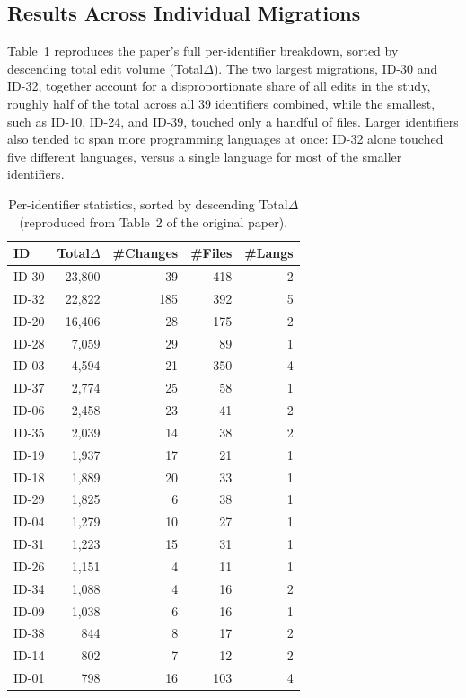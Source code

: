 \subsection{Results Across Individual Migrations}
Table~\ref{tab:perid} reproduces the paper's full per-identifier
breakdown, sorted by descending total edit volume (Total$\Delta$).
The two largest migrations, ID-30 and ID-32, together account for a
disproportionate share of all edits in the study, roughly half of the
total across all 39 identifiers combined, while the smallest, such as
ID-10, ID-24, and ID-39, touched only a handful of files. Larger
identifiers also tended to span more programming languages at once:
ID-32 alone touched five different languages, versus a single
language for most of the smaller identifiers.


\begin{table}[t]
\caption{Per-identifier statistics, sorted by descending Total$\Delta$ (reproduced from Table~2 of the original paper).}
\label{tab:perid}
\footnotesize
\begin{tabular}{@{}lrrrr@{}}
\toprule
ID & Total$\Delta$ & \#Changes & \#Files & \#Langs \\
\midrule
ID-30 & 23{,}800 & 39 & 418 & 2 \\
ID-32 & 22{,}822 & 185 & 392 & 5 \\
ID-20 & 16{,}406 & 28 & 175 & 2 \\
ID-28 & 7{,}059 & 29 & 89 & 1 \\
ID-03 & 4{,}594 & 21 & 350 & 4 \\
ID-37 & 2{,}774 & 25 & 58 & 1 \\
ID-06 & 2{,}458 & 23 & 41 & 2 \\
ID-35 & 2{,}039 & 14 & 38 & 2 \\
ID-19 & 1{,}937 & 17 & 21 & 1 \\
ID-18 & 1{,}889 & 20 & 33 & 1 \\
ID-29 & 1{,}825 & 6 & 38 & 1 \\
ID-04 & 1{,}279 & 10 & 27 & 1 \\
ID-31 & 1{,}223 & 15 & 31 & 1 \\
ID-26 & 1{,}151 & 4 & 11 & 1 \\
ID-34 & 1{,}088 & 4 & 16 & 2 \\
ID-09 & 1{,}038 & 6 & 16 & 1 \\
ID-38 & 844 & 8 & 17 & 2 \\
ID-14 & 802 & 7 & 12 & 2 \\
ID-01 & 798 & 16 & 103 & 4 \\

\end{tabular}
\end{table}
